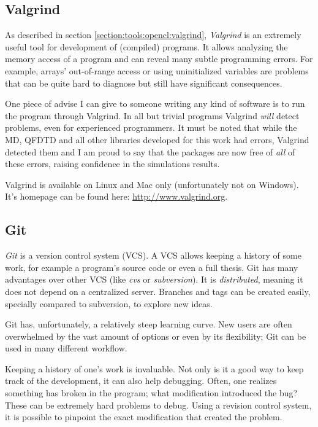 \subsection*{Valgrind}

As described in section \ref{section:tools:opencl:valgrind}, \textit{Valgrind}
is an extremely useful tool for development of (compiled) programs. It allows
analyzing the memory access of a program and can reveal many subtle programming
errors. For example, arrays' out-of-range access or using uninitialized
variables are problems that can be quite hard to diagnose but still have
significant consequences.

One piece of advise I can give to someone writing any kind of software is to
run the program through Valgrind. In all but trivial programs Valgrind
\textit{will} detect problems, even for experienced programmers. It must be
noted that while the MD, QFDTD and all other libraries developed for this work
had errors, Valgrind detected them and I am proud to say that the packages are
now free of \textit{all} of these errors, raising confidence in the simulations
results.

Valgrind is available on Linux and Mac only (unfortunately not on Windows). It's
homepage can be found here: \url{http://www.valgrind.org}.


\subsection*{Git}

\textit{Git} is a version control system (VCS). A VCS allows keeping a history
of some work, for example a program's source code or even a full thesis. Git
has many advantages over other VCS (like \textit{cvs} or \textit{subversion}).
It is \textit{distributed}, meaning it does not depend on a centralized server.
Branches and tags can be created easily, specially compared to subversion,
to explore new ideas.

Git has, unfortunately, a relatively steep learning curve. New users are often
overwhelmed by the vast amount of options or even by its flexibility; Git can
be used in many different workflow.

Keeping a history of one's work is invaluable. Not only is it a good way to keep
track of the development, it can also help debugging. Often, one realizes
something has broken in the program; what modification introduced the bug? These can
be extremely hard problems to debug. Using a revision control system, it is
possible to pinpoint the exact modification that created the problem.

